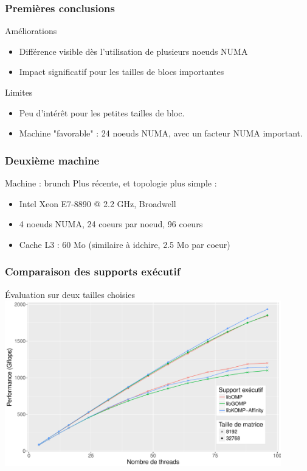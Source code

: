 \documentclass[xcolor={usenames,dvipsnames,svgnames,table}, aspectratio=43]{beamer}
\begin{document}
\begin{frame}
  \frametitle{Premières conclusions}
  \begin{exampleblock}{Améliorations}
    \begin{itemize}
      \item Différence visible dès l'utilisation de plusieurs noeuds NUMA
      \item Impact significatif pour les tailles de blocs importantes
    \end{itemize}
  \end{exampleblock}

  \begin{alertblock}{Limites}
    \begin{itemize}
      \item Peu d'intérêt pour les petites tailles de bloc.
      \item Machine "favorable" : 24 noeuds NUMA, avec un facteur NUMA important.
    \end{itemize}
  \end{alertblock}
\end{frame}

\begin{frame}
\frametitle{Deuxième machine}

\begin{block}{Machine : brunch}
  Plus récente, et topologie plus simple :
  \begin{itemize}
    \item Intel Xeon E7-8890 @ 2.2 GHz, Broadwell
    \item 4 noeuds NUMA, 24 coeurs par noeud, 96 coeurs
    \item Cache L3 : 60 Mo (similaire à idchire, 2.5 Mo par coeur)
  \end{itemize}
\end{block}

\end{frame}

\begin{frame}
  \frametitle{Comparaison des supports exécutif}
  Évaluation sur deux tailles choisies
  \includegraphics[width=0.9\textwidth]{graph/graph_all_cholesky_brunch.pdf}
\end{frame}
\end{document}
